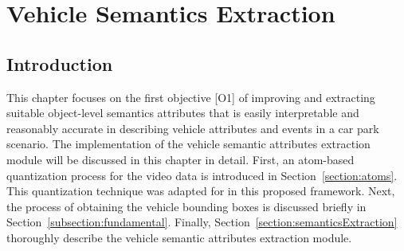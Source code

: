 \chapter{Vehicle Semantics Extraction}

\label{section:semanticsextraction}

\section{Introduction}

This chapter focuses on the first objective [O1] of improving and extracting suitable object-level semantics attributes that is easily interpretable and reasonably accurate in describing vehicle attributes and events in a car park scenario. 
The implementation of the vehicle semantic attributes extraction module will be discussed in this chapter in detail.
First, an atom-based quantization process for the video data is introduced in Section~\ref{section:atoms}.
This quantization technique was adapted for in this proposed framework.
Next, the process of obtaining the vehicle bounding boxes is discussed briefly in Section~\ref{subsection:fundamental}. 
Finally, Section~\ref{section:semanticsExtraction} thoroughly describe the vehicle semantic attributes extraction module.


